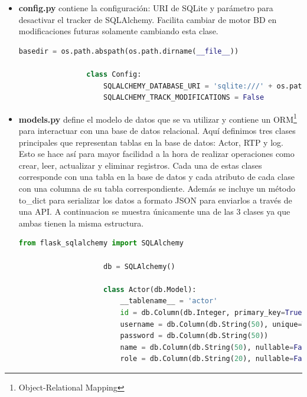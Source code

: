 \begin{itemize}
\begin{lstlisting}[language=Python, style=custom]
            if __name__ == '__main__':
                webbrowser.open("http://127.0.0.1:5000/")
                socketio.run(app, debug=True)
        \end{lstlisting}

    \item \textbf{config.py} contiene la configuración: URI de SQLite y parámetro para desactivar el tracker de SQLAlchemy. Facilita cambiar de motor BD en modificaciones futuras solamente cambiando esta clase.
            \begin{lstlisting}[language=Python, style=custom]
                basedir = os.path.abspath(os.path.dirname(__file__))

                class Config:
                    SQLALCHEMY_DATABASE_URI = 'sqlite:///' + os.path.join(basedir, 'rtp.db')
                    SQLALCHEMY_TRACK_MODIFICATIONS = False

            \end{lstlisting}

    \item \textbf{models.py} define el modelo de datos que se va utilizar y contiene un ORM\footnote{Object-Relational Mapping} para interactuar con una base de datos relacional. Aquí definimos tres clases principales que representan tablas en la base de datos: Actor, RTP y log.
            Esto se hace así para mayor facilidad a la hora de realizar operaciones como crear, leer, actualizar y eliminar registros.
            Cada una de estas clases corresponde con una tabla en la base de datos y cada atributo de cada clase con una columna de su tabla correspondiente. Además se incluye un método to_dict para serializar los datos a formato JSON para enviarlos a través de una API.
            A continuacion se muestra únicamente una de las 3 clases ya que ambas tienen la misma estructura.

            \begin{lstlisting}[language=Python, style=custom]
                    from flask_sqlalchemy import SQLAlchemy

                    db = SQLAlchemy()

                    class Actor(db.Model):
                        __tablename__ = 'actor'
                        id = db.Column(db.Integer, primary_key=True)
                        username = db.Column(db.String(50), unique=True)
                        password = db.Column(db.String(50))
                        name = db.Column(db.String(50), nullable=False)
                        role = db.Column(db.String(20), nullable=False)


\end{lstlisting}
\end{itemize}
